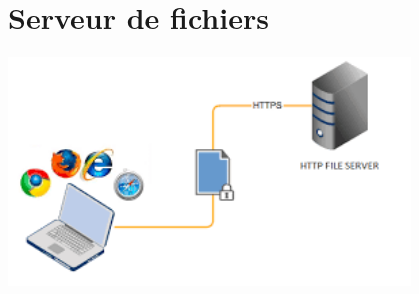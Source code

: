 \section{Serveur de fichiers}
\vspace{4mm}
\paragraph{
	\includegraphics[width=0.8\textwidth]{PhotoMemoire/serveur_fichier.png}}
